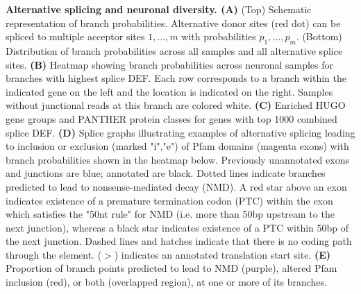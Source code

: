 \textbf{Alternative splicing and neuronal diversity. (A)} (Top) Schematic representation of branch probabilities. Alternative donor sites (red dot) can be spliced to multiple acceptor sites $1,\ldots, m$ with probabilities $p_{1},\ldots,p_{m}$. (Bottom) Distribution of branch probabilities across all samples and all alternative splice sites. \textbf{(B)} Heatmap showing branch probabilities across neuronal samples for branches with highest splice DEF. Each row corresponds to a branch within the indicated gene on the left and the location is indicated on the right. Samples without junctional reads at this branch are colored white. \textbf{(C)} Enriched HUGO gene groups and PANTHER protein classes for genes with top 1000 combined splice DEF. \textbf{(D)} Splice graphs illustrating examples of alternative splicing leading to inclusion or exclusion (marked "i","e") of Pfam domains (magenta exons) with branch probabilities shown in the heatmap below. Previously unannotated exons and junctions are blue; annotated are black. Dotted lines indicate branches predicted to lead to nonsense-mediated decay (NMD). A red star above an exon indicates existence of a premature termination codon (PTC) within the exon which satisfies the "50nt rule" for NMD \citep{Nagy_1998} (i.e. more than 50bp upstream to the next junction), whereas a black star indicates existence of a PTC within 50bp of the next junction. Dashed lines and hatches indicate that there is no coding path through the element. ($>$) indicates an annotated translation start site. \textbf{(E)} Proportion of branch points predicted to lead to NMD (purple), altered Pfam inclusion (red), or both (overlapped region), at one or more of its branches.
